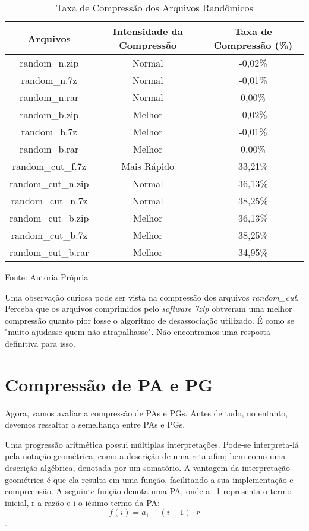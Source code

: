 \begin{table}[htbp]
    \centering
    \caption{Taxa de Compressão dos Arquivos Randômicos}
    \label{tab:compressão_rand}
    \begin{tabular}{c|c|c}
    \hline
    \textbf{Arquivos} & \textbf{Intensidade da Compressão} & \textbf{Taxa de Compressão (\%)} \\ \hline
    random\_n.zip & Normal & -0,02\% \\ \hline
    random\_n.7z & Normal & -0,01\% \\ \hline
    random\_n.rar & Normal & 0,00\% \\ \hline
    random\_b.zip & Melhor & -0,02\% \\ \hline
    random\_b.7z & Melhor & -0,01\% \\ \hline
    random\_b.rar & Melhor & 0,00\% \\ \hline
    random\_cut\_f.7z & Mais Rápido & 33,21\% \\ \hline
    random\_cut\_n.zip & Normal & 36,13\% \\ \hline
    random\_cut\_n.7z & Normal & 38,25\% \\ \hline
    random\_cut\_b.zip & Melhor & 36,13\% \\ \hline
    random\_cut\_b.7z & Melhor & 38,25\% \\ \hline
    random\_cut\_b.rar & Melhor & 34,95\% \\ \hline
    \end{tabular}
    Fonte: Autoria Própria
\end{table}

\hspace{1.5 cm} Uma observação curiosa pode ser vista na compressão dos arquivos \textit{random\_cut}. Perceba que os arquivos comprimidos pelo \textit{software 7zip}  obtveram uma melhor compressão quanto pior fosse o algoritmo de desassociação utilizado. É como se "muito ajudasse quem não atrapalhasse". Não encontramos uma resposta definitiva para isso.

\section{Compressão de PA e PG}
Agora, vamos avaliar a compressão de PAs e PGs. Antes de tudo, no entanto, devemos ressaltar a semelhança entre PAs e PGs.

\hspace{1.5 cm} Uma progressão aritmética possui múltiplas interpretações. Pode-se interpreta-lá pela notação geométrica, como a descrição de uma reta afim; bem como uma descrição algébrica, denotada por um somatório. A vantagem da interpretação geométrica é que ela resulta em uma função, facilitando a sua implementação e compreensão. A seguinte função denota uma PA, onde a_1 representa o termo inicial, r a razão e i o iésimo termo da PA:  \begin{equation*} f(i) = a_1 + (i-1) \cdot r \end{equation*}.

